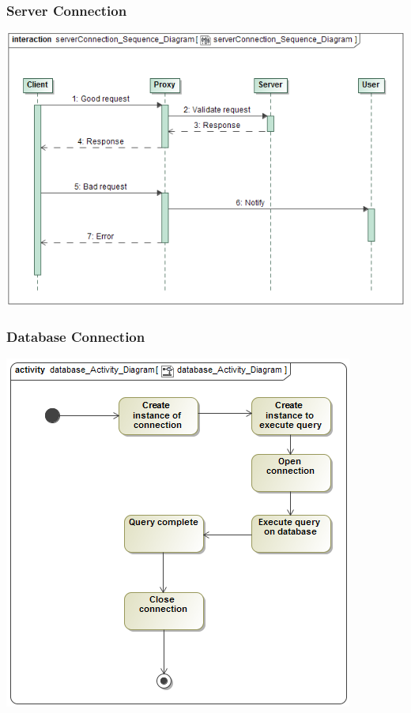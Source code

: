 \documentclass[11pt]{article}
\begin{document}
	\subsubsection{Server Connection}
	\begin{center}
		\includegraphics[width=\textwidth]{../Images/Server_Connection_Sequence_Diagram.png}\\[0.5cm]
	\end{center}
	
	\newpage
	\subsubsection{Database Connection}
	\begin{center}
		\includegraphics[width=\textwidth]{../Images/database_Activity_Diagram.png}\\[0.5cm]
	\end{center}
	
\end{document}
